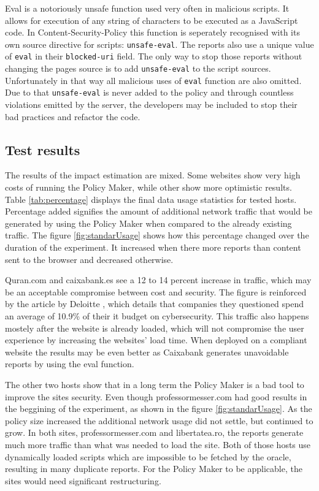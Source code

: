 Eval is a notoriously unsafe function used very often in malicious scripts. 
It allows for execution of any string of characters to be executed as a JavaScript code. 
In Content-Security-Policy this function is seperately recognised with its own source directive for scripts: \texttt{unsafe-eval}.
The reports also use a unique value of \texttt{eval} in their \texttt{blocked-uri} field.
The only way to stop those reports without changing the pages source is to add \texttt{unsafe-eval} to the script sources.
Unfortunately in that way all malicious uses of \texttt{eval} function are also omitted.
Due to that \texttt{unsafe-eval} is never added to the policy and through countless violations emitted by the server, the developers may be included to stop their bad practices and refactor the code.

\subsection{Test results}

The results of the impact estimation are mixed. 
Some websites show very high costs of running the Policy Maker, while other show more optimistic results.
Table \ref{tab:percentage} displays the final data usage statistics for tested hosts.
Percentage added signifies the amount of additional network traffic that would be generated by using the Policy Maker when compared to the already existing traffic.
The figure \ref{fig:standarUsage} shows how this percentage changed over the duration of the experiment.
It increased when there more reports than content sent to the browser and decreased otherwise.

Quran.com and caixabank.es see a 12 to 14 percent increase in traffic, which may be an acceptable compromise between cost and security.
The figure is reinforced by the article by Deloitte \cite{secSpend}, which details that companies they questioned spend an average of 10.9\% of their it budget on cybersecurity.
This traffic also happens mostely after the website is already loaded, which will not compromise the user experience by increasing the websites' load time.
When deployed on a compliant website the results may be even better as Caixabank generates unavoidable reports by using the eval function.


The other two hosts show that in a long term the Policy Maker is a bad tool to improve the sites security.
Even though professormesser.com had good results in the beggining of the experiment, as shown in the figure \ref{fig:standarUsage}.
As the policy size increased the additional network usage did not settle, but continued to grow.
In both sites, professormesser.com and libertatea.ro, the reports generate much more traffic than what was needed to load the site.
Both of those hosts use dynamically loaded scripts which are impossible to be fetched by the oracle, resulting in many duplicate reports.
For the Policy Maker to be applicable, the sites would need significant restructuring.

